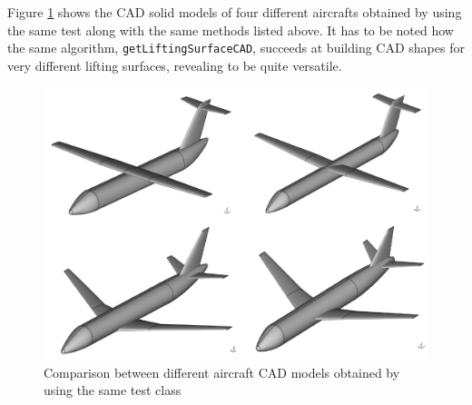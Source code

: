 \bigskip
\noindent
Figure \ref{fig:Example01} shows the \gls{CAD} solid models of four different aircrafts obtained by using the same test along with the same methods listed above. It has to be noted how the same algorithm, \lstinline[language=Java]!getLiftingSurfaceCAD!, succeeds at building \gls{CAD} shapes for very different lifting surfaces, revealing to be quite versatile.
% 
\begin{figure}[H]
\centering
\includegraphics[scale=0.45]{Immagini/Capitolo3/Aircrafts/aircrafts_1}
\caption{Comparison between different aircraft CAD models obtained by using the same test class}
\label{fig:Example01}
\end{figure}
%  
